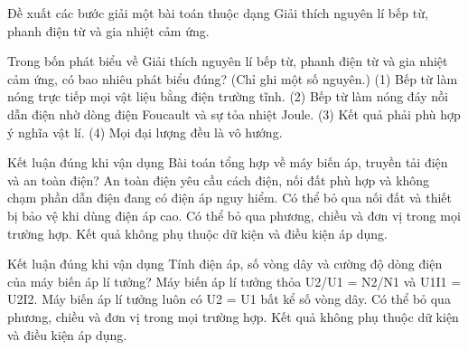 \begin{bt}
Đề xuất các bước giải một bài toán thuộc dạng Giải thích nguyên lí bếp từ, phanh điện từ và gia nhiệt cảm ứng.
\end{bt}

\begin{ex}
Trong bốn phát biểu về Giải thích nguyên lí bếp từ, phanh điện từ và gia nhiệt cảm ứng, có bao nhiêu phát biểu đúng? (Chỉ ghi một số nguyên.) (1) Bếp từ làm nóng trực tiếp mọi vật liệu bằng điện trường tĩnh. (2) Bếp từ làm nóng đáy nồi dẫn điện nhờ dòng điện Foucault và sự tỏa nhiệt Joule. (3) Kết quả phải phù hợp ý nghĩa vật lí. (4) Mọi đại lượng đều là vô hướng.
\end{ex}

\begin{ex}
Kết luận đúng khi vận dụng Bài toán tổng hợp về máy biến áp, truyền tải điện và an toàn điện?
\choice
{\True An toàn điện yêu cầu cách điện, nối đất phù hợp và không chạm phần dẫn điện đang có điện áp nguy hiểm.}
{Có thể bỏ qua nối đất và thiết bị bảo vệ khi dùng điện áp cao.}
{Có thể bỏ qua phương, chiều và đơn vị trong mọi trường hợp.}
{Kết quả không phụ thuộc dữ kiện và điều kiện áp dụng.}
\end{ex}

\begin{ex}
Kết luận đúng khi vận dụng Tính điện áp, số vòng dây và cường độ dòng điện của máy biến áp lí tưởng?
\choice
{\True Máy biến áp lí tưởng thỏa U2/U1 = N2/N1 và U1I1 = U2I2.}
{Máy biến áp lí tưởng luôn có U2 = U1 bất kể số vòng dây.}
{Có thể bỏ qua phương, chiều và đơn vị trong mọi trường hợp.}
{Kết quả không phụ thuộc dữ kiện và điều kiện áp dụng.}
\end{ex}

